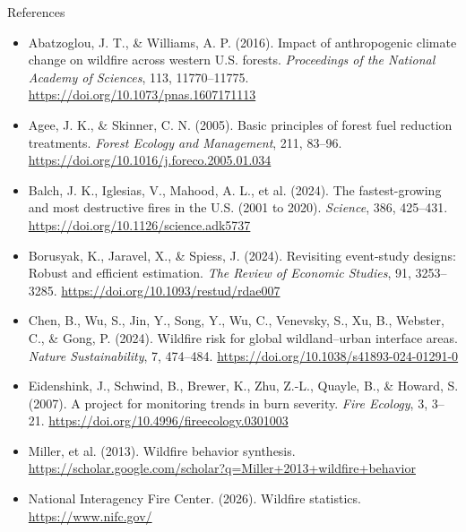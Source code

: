 \documentclass[10pt,aspectratio=169]{beamer}
\begin{document}
\begin{frame}[allowframebreaks]{References}
  \footnotesize
  \begin{itemize}
    \item \hypertarget{ref:abatzoglou2016}{Abatzoglou, J. T., \& Williams, A. P. (2016). Impact of anthropogenic climate change on wildfire across western U.S. forests. \textit{Proceedings of the National Academy of Sciences}, 113, 11770--11775. \href{https://doi.org/10.1073/pnas.1607171113}{https://doi.org/10.1073/pnas.1607171113}}
    \item \hypertarget{ref:agee2005}{Agee, J. K., \& Skinner, C. N. (2005). Basic principles of forest fuel reduction treatments. \textit{Forest Ecology and Management}, 211, 83--96. \href{https://doi.org/10.1016/j.foreco.2005.01.034}{https://doi.org/10.1016/j.foreco.2005.01.034}}
    \item \hypertarget{ref:balch2024}{Balch, J. K., Iglesias, V., Mahood, A. L., et al. (2024). The fastest-growing and most destructive fires in the U.S. (2001 to 2020). \textit{Science}, 386, 425--431. \href{https://doi.org/10.1126/science.adk5737}{https://doi.org/10.1126/science.adk5737}}
    \item \hypertarget{ref:borusyak2024}{Borusyak, K., Jaravel, X., \& Spiess, J. (2024). Revisiting event-study designs: Robust and efficient estimation. \textit{The Review of Economic Studies}, 91, 3253--3285. \href{https://doi.org/10.1093/restud/rdae007}{https://doi.org/10.1093/restud/rdae007}}
    \item \hypertarget{ref:chen2024}{Chen, B., Wu, S., Jin, Y., Song, Y., Wu, C., Venevsky, S., Xu, B., Webster, C., \& Gong, P. (2024). Wildfire risk for global wildland--urban interface areas. \textit{Nature Sustainability}, 7, 474--484. \href{https://doi.org/10.1038/s41893-024-01291-0}{https://doi.org/10.1038/s41893-024-01291-0}}
    \item \hypertarget{ref:eidenshink2007}{Eidenshink, J., Schwind, B., Brewer, K., Zhu, Z.-L., Quayle, B., \& Howard, S. (2007). A project for monitoring trends in burn severity. \textit{Fire Ecology}, 3, 3--21. \href{https://doi.org/10.4996/fireecology.0301003}{https://doi.org/10.4996/fireecology.0301003}}
    \item \hypertarget{ref:miller2013}{Miller, et al. (2013). Wildfire behavior synthesis. \href{https://scholar.google.com/scholar?q=Miller+2013+wildfire+behavior}{https://scholar.google.com/scholar?q=Miller+2013+wildfire+behavior}}
    \item \hypertarget{ref:nifc2025}{National Interagency Fire Center. (2026). Wildfire statistics. \href{https://www.nifc.gov/}{https://www.nifc.gov/}}

\end{itemize}
\end{frame}
\end{document}
